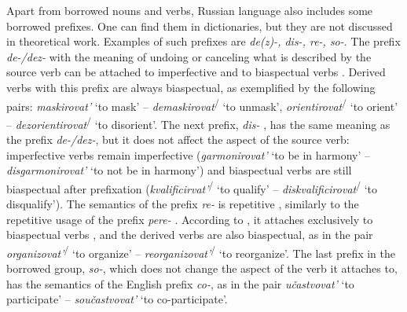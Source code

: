 Apart from borrowed nouns and verbs, Russian language also includes some borrowed prefixes.  One can find them in dictionaries, but they are not discussed in theoretical work. Examples of such prefixes are \textit{de(z)-, dis-, re-, so-}. The prefix \textit{de-/dez-} with the meaning of undoing or canceling what is described by the source verb can be attached to imperfective and to biaspectual verbs . Derived verbs with this prefix are always biaspectual, as exemplified by the following pairs: \textit{maskirovat'}\textsuperscript{\IPF} `to mask' -- \textit{demaskirovat}\textsuperscript{\IPF\slash\PF} `to unmask', \textit{orientirovat}\textsuperscript{\IPF\slash\PF} `to orient' -- \textit{dezorientirovat}\textsuperscript{\IPF\slash\PF} `to disorient'. The next prefix, \textit{dis-}  , has the same meaning as the prefix \textit{de-/dez-}, but it does not affect the aspect of the source verb: imperfective verbs  remain imperfective    (\textit{garmonirovat'}\textsuperscript{\IPF} `to be in harmony' -- \textit{disgarmonirovat'}\textsuperscript{\IPF} `to not be in harmony') and biaspectual verbs  are still biaspectual after prefixation  (\textit{kvalificirvat'}\textsuperscript{\IPF\slash\PF} `to qualify' -- \textit{diskvalificirovat}\textsuperscript{\IPF\slash\PF} `to disqualify'). The semantics of the prefix \textit{re-}   is repetitive , similarly to the repetitive  usage of the prefix \textit{pere-}  . According to \citet[369]{Shvedova:82}, it attaches exclusively to biaspectual verbs , and the derived verbs are also biaspectual, as in the pair \textit{organizovat'}\textsuperscript{\IPF\slash\PF}  `to organize' -- \textit{reorganizovat'}\textsuperscript{\IPF\slash\PF}  `to reorganize'. The last prefix in the borrowed group, \textit{so-}, which does not change the aspect of the verb it attaches to, has the semantics of the English prefix \textit{co-}, as in the pair  \textit{u\v{c}astvovat'}\textsuperscript{\IPF}  `to participate' -- \textit{sou\v{c}astvovat'}\textsuperscript{\IPF}  `to co-participate'.

